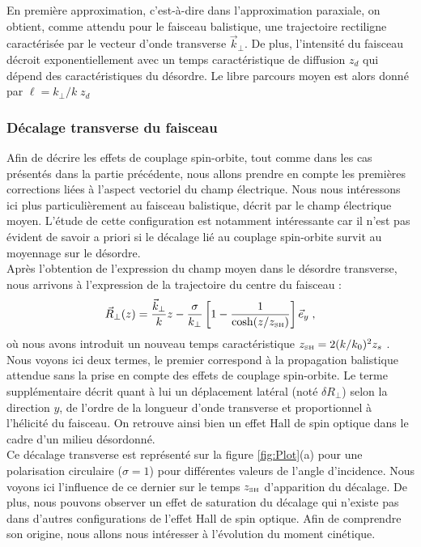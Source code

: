 \documentclass[a4paper,11pt]{article} %
\begin{document}
	En première approximation, c'est-à-dire dans l'approximation paraxiale, on obtient, comme attendu pour le faisceau balistique, une trajectoire rectiligne caractérisée par le vecteur d'onde transverse $ \vec{k}_\perp $. De plus, l'intensité du faisceau décroit exponentiellement avec un temps caractéristique de diffusion $ z_d $ qui dépend des caractéristiques du désordre. Le libre parcours moyen est alors donné par $ \ell = k_\perp/k \; z_d $\\
	
	\subsubsection{Décalage transverse du faisceau}
	
	Afin de décrire les effets de couplage spin-orbite, tout comme dans les cas présentés dans la partie précédente, nous allons prendre en compte les premières corrections liées à l'aspect vectoriel du champ électrique. Nous nous intéressons ici plus particulièrement au faisceau balistique, décrit par le champ électrique moyen. L'étude de cette configuration est notamment intéressante car il n'est pas évident de savoir a priori si le décalage lié au couplage spin-orbite survit au moyennage sur le désordre.\\
	
	Après l'obtention de l'expression du champ moyen dans le désordre transverse, nous arrivons à l'expression de la trajectoire du centre du faisceau :
	\begin{equation*}
		\vec{R}_\perp (z) = \frac{\vec{k}_\perp}{k} z - \frac{\sigma}{k_\perp} \left[ 1 - \frac{1}{\cosh (z/z_\text{\tiny SH})} \right] \vec{e}_y \; ,
	\end{equation*}
	où nous avons introduit un nouveau temps caractéristique $ z_\text{{\tiny SH}} = 2 (k/k_0)^2 z_s  $ . Nous voyons ici deux termes, le premier correspond à la propagation balistique attendue sans la prise en compte des effets de couplage spin-orbite. Le terme supplémentaire décrit quant à lui un déplacement latéral (noté $ \delta R_\perp $) selon la direction $y$, de l'ordre de la longueur d'onde transverse et proportionnel à l'hélicité du faisceau. On retrouve ainsi bien un effet Hall de spin optique dans le cadre d'un milieu désordonné.\\
	
	
	Ce décalage transverse est représenté sur la figure \ref{fig:Plot}(a) pour une polarisation circulaire ($\sigma = 1$) pour différentes valeurs de l'angle d'incidence. Nous voyons ici l'influence de ce dernier sur le temps $ z_\text{{\tiny SH}} $ d'apparition du décalage. De plus, nous pouvons observer un effet de saturation du décalage qui n'existe pas dans d'autres configurations de l'effet Hall de spin optique. Afin de comprendre son origine, nous allons nous intéresser à l'évolution du moment cinétique.
	
\end{document}
